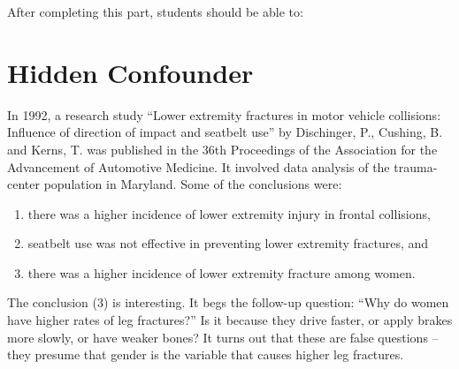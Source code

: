 \documentclass[11pt, chapterprefix=true]{scrbook}\usepackage[]{graphicx}\usepackage[]{color}
\begin{document}
After completing this part, students should be able to:


\section{Hidden Confounder}  

In 1992, a research study “Lower extremity fractures in motor vehicle collisions:
Influence of direction of impact and seatbelt use” by Dischinger, P., Cushing, B. and Kerns, T. was published in the 36th Proceedings of the Association for the Advancement of Automotive Medicine.  It involved data analysis of the trauma-center population in Maryland.  Some of the conclusions were:

\begin{enumerate}
   \item there was a higher incidence of lower extremity injury in frontal collisions,
   \item seatbelt use was not effective in preventing lower extremity fractures, and
   \item there was a higher incidence of lower extremity fracture among women.
\end{enumerate}

The conclusion (3) is interesting.  It begs the follow-up question: ``Why do women have higher rates of leg fractures?''  Is it because they drive faster, or apply brakes more slowly, or have weaker bones?  It turns out that these are false questions -- they presume that gender is the variable that causes higher leg fractures.
\end{document}
